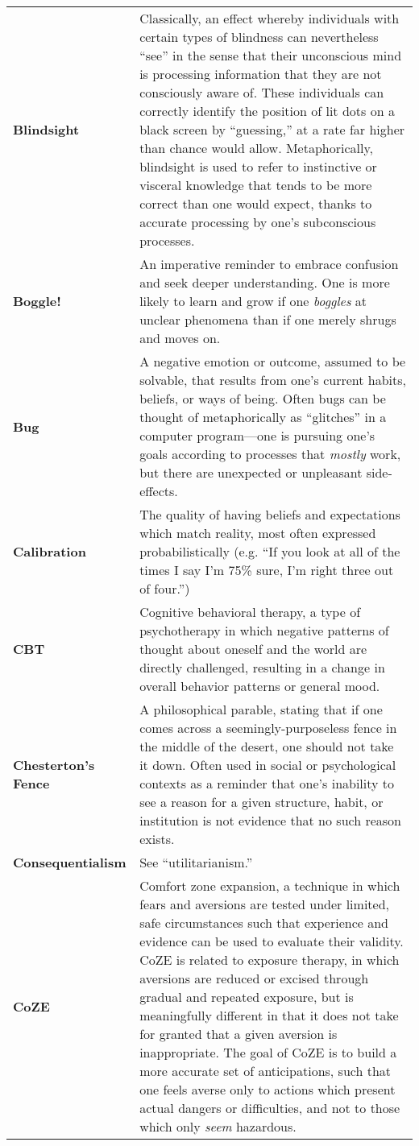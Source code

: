 \begin{longtable} { p{} p{} }
\textbf{Blindsight} & Classically, an effect whereby individuals with certain types of blindness can nevertheless ``see'' in the sense that their unconscious mind is processing information that they are not consciously aware of.  These individuals can correctly identify the position of lit dots on a black screen by ``guessing,'' at a rate far higher than chance would allow.  Metaphorically, blindsight is used to refer to instinctive or visceral knowledge that tends to be more correct than one would expect, thanks to accurate processing by one's subconscious processes.\\

\textbf{Boggle!} & An imperative reminder to embrace confusion and seek deeper understanding.  One is more likely to learn and grow if one \emph{boggles} at unclear phenomena than if one merely shrugs and moves on.\\

\textbf{Bug} & A negative emotion or outcome, assumed to be solvable, that results from one's current habits, beliefs, or ways of being.  Often bugs can be thought of metaphorically as ``glitches'' in a computer program---one is pursuing one's goals according to processes that \emph{mostly} work, but there are unexpected or unpleasant side-effects.\\

\textbf{Calibration} & The quality of having beliefs and expectations which match reality, most often expressed probabilistically (e.g. ``If you look at all of the times I say I'm 75\% sure, I'm right three out of four.'')\\

\textbf{CBT} & Cognitive behavioral therapy, a type of psychotherapy in which negative patterns of thought about oneself and the world are directly challenged, resulting in a change in overall behavior patterns or general mood.\\

\textbf{Chesterton's Fence} & A philosophical parable, stating that if one comes across a seemingly-purposeless fence in the middle of the desert, one should not take it down.  Often used in social or psychological contexts as a reminder that one's inability to see a reason for a given structure, habit, or institution is not evidence that no such reason exists.\\

\textbf{Consequentialism} & See ``utilitarianism.''\\

\textbf{CoZE} & Comfort zone expansion, a technique in which fears and aversions are tested under limited, safe circumstances such that experience and evidence can be used to evaluate their validity.  CoZE is related to exposure therapy, in which aversions are reduced or excised through gradual and repeated exposure, but is meaningfully different in that it does not take for granted that a given aversion is inappropriate.  The goal of CoZE is to build a more accurate set of anticipations, such that one feels averse only to actions which present actual dangers or difficulties, and not to those which only \emph{seem} hazardous.\\


\end{longtable}
